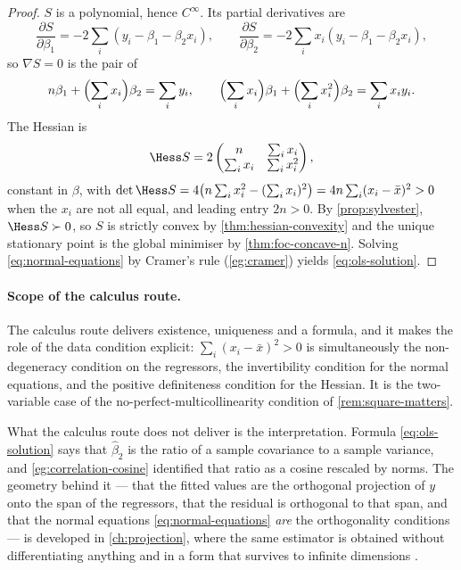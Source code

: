 \begin{proof}
	$S$ is a polynomial, hence $C^\infty$. Its partial derivatives are
	\[
		\frac{\partial S}{\partial\beta_1}=-2\sum_i(y_i-\beta_1-\beta_2x_i),
		\qquad
		\frac{\partial S}{\partial\beta_2}=-2\sum_ix_i(y_i-\beta_1-\beta_2x_i),
	\]
	so $\nabla S=0$ is the pair of 
	\begin{equation}\label{eq:normal-equations}
		n\beta_1+\Bigl(\sum_ix_i\Bigr)\beta_2=\sum_iy_i,
		\qquad
		\Bigl(\sum_ix_i\Bigr)\beta_1+\Bigl(\sum_ix_i^2\Bigr)\beta_2=\sum_ix_iy_i .
	\end{equation}
	The Hessian is
	\[
		\Hess S=2\begin{pmatrix}n & \sum_ix_i \\ \sum_ix_i & \sum_ix_i^2\end{pmatrix},
	\]
	constant in $\beta$, with $\det\Hess S=4\bigl(n\sum_ix_i^2-(\sum_ix_i)^2\bigr)
		=4n\sum_i(x_i-\bar x)^2>0$ when the $x_i$ are not all equal, and leading entry
	$2n>0$. By \autoref{prop:sylvester}, $\Hess S\succ0$, so $S$ is strictly convex
	by \autoref{thm:hessian-convexity} and the unique stationary point is the global
	minimiser by \autoref{thm:foc-concave-n}. Solving \eqref{eq:normal-equations} by
	Cramer's rule (\autoref{eg:cramer}) yields \eqref{eq:ols-solution}.
\end{proof}

\paragraph{Scope of the calculus route.} The calculus route delivers existence,
uniqueness and a formula, and it makes the role of the data condition explicit:
$\sum_i(x_i-\bar x)^2>0$ is simultaneously the non-degeneracy condition on the
regressors, the invertibility condition for the normal equations, and the
positive definiteness condition for the Hessian. It is the two-variable case of
the no-perfect-multicollinearity condition of \autoref{rem:square-matters}.

What the calculus route does not deliver is the interpretation. Formula
\eqref{eq:ols-solution} says that $\hat\beta_2$ is the ratio of a sample
covariance to a sample variance, and \autoref{eg:correlation-cosine} identified
that ratio as a cosine rescaled by norms. The geometry behind it --- that the
fitted values are the orthogonal projection of $y$ onto the span of the
regressors, that the residual is orthogonal to that span, and that the normal
equations \eqref{eq:normal-equations} \emph{are} the orthogonality conditions ---
is developed in \autoref{ch:projection}, where the same estimator is obtained
without differentiating anything and in a form that survives to infinite
dimensions \autocite[slides 55--64]{fukuda2026calculus}.


